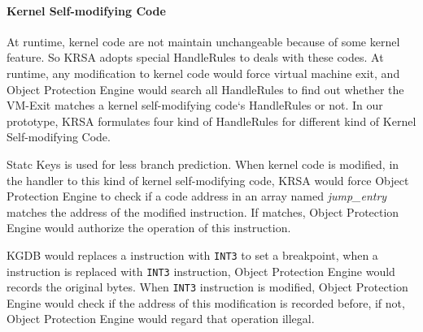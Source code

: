 \documentclass[conference]{IEEEtran}
\begin{document}
\paragraph{Kernel Self-modifying Code}
At runtime, kernel code are not maintain unchangeable because of some kernel feature.
So KRSA adopts special HandleRules to deals with these codes. At runtime, any modification to kernel code would force virtual machine exit, and Object Protection Engine would search all HandleRules to find out whether the VM-Exit matches a kernel self-modifying code`s HandleRules or not. In our prototype, KRSA formulates four kind of HandleRules for different kind of Kernel Self-modifying Code. 

Statc Keys is used for less branch prediction. When kernel code is modified, in the handler to this kind of kernel self-modifying code, KRSA would force Object Protection Engine to check if a code address in an array named \textit{jump\_entry} matches the address of the modified instruction. If matches, Object Protection Engine would authorize the operation of this instruction.  



KGDB would replaces a instruction with \verb|INT3| to set a breakpoint, when a instruction is replaced with \verb|INT3| instruction, Object Protection Engine would records the original bytes. When \verb|INT3| instruction is modified, Object Protection Engine would check if the address of this modification is recorded before, if not, Object Protection Engine would regard that operation illegal. 
\end{document}
